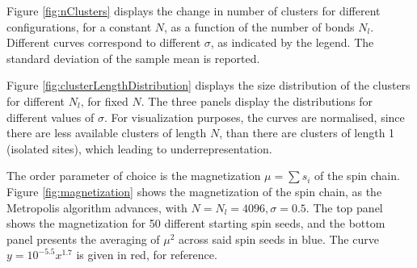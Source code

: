 \documentclass[a4paper]{article}
\providecommand{\DIFaddtex}[1]{{\protect\color{blue}\uwave{#1}}} %
\providecommand{\DIFdeltex}[1]{{\protect\color{red}\sout{#1}}}                      %
\providecommand{\DIFaddbegin}{} %
\providecommand{\DIFaddend}{} %
\providecommand{\DIFdelbegin}{} %
\providecommand{\DIFdelend}{} %
\providecommand{\DIFadd}[1]{\texorpdfstring{\DIFaddtex{#1}}{#1}} %
\providecommand{\DIFdel}[1]{\texorpdfstring{\DIFdeltex{#1}}{}} %
\newcommand{\DIFscaledelfig}{0.5}
\newlength{\DIFdelgraphicswidth} %
\newlength{\DIFdelgraphicsheight} %
\newcommand{\DIFaddincludegraphics}[2][]{{\color{blue}\fbox{\DIFOincludegraphics[#1]{#2}}}} %
\newcommand{\DIFdelincludegraphics}[2][]{%
\sbox{\DIFdelgraphicsbox}{\DIFOincludegraphics[#1]{#2}}%
\settoboxwidth{\DIFdelgraphicswidth}{\DIFdelgraphicsbox} %
\settoboxtotalheight{\DIFdelgraphicsheight}{\DIFdelgraphicsbox} %
\scalebox{\DIFscaledelfig}{%
\parbox[b]{\DIFdelgraphicswidth}{\usebox{\DIFdelgraphicsbox}\\[-\baselineskip] \rule{\DIFdelgraphicswidth}{0em}}\llap{\resizebox{\DIFdelgraphicswidth}{\DIFdelgraphicsheight}{%
\setlength{\unitlength}{\DIFdelgraphicswidth}%
\begin{picture}(1,1)%
\thicklines\linethickness{2pt} %
{\color[rgb]{1,0,0}\put(0,0){\framebox(1,1){}}}%
{\color[rgb]{1,0,0}\put(0,0){\line( 1,1){1}}}%
{\color[rgb]{1,0,0}\put(0,1){\line(1,-1){1}}}%
\end{picture}%
}\hspace*{3pt}}} %
} %
\DeclareRobustCommand{\DIFaddbegin}{\DIFOaddbegin \let\includegraphics\DIFaddincludegraphics} %
\DeclareRobustCommand{\DIFaddend}{\DIFOaddend \let\includegraphics\DIFOincludegraphics} %
\DeclareRobustCommand{\DIFdelbegin}{\DIFOdelbegin \let\includegraphics\DIFdelincludegraphics} %
\DeclareRobustCommand{\DIFdelend}{\DIFOaddend \let\includegraphics\DIFOincludegraphics} %
\begin{document}
%
%
%


Figure \ref{fig:nClusters} displays the change in number of clusters for different configurations, for a constant $N$, as a function of the number of bonds $N_l.$ Different curves correspond to different  $\sigma$, as indicated by the legend. The standard deviation of the sample mean is reported.

Figure \ref{fig:clusterLengthDistribution} displays the size distribution of the clusters for different $N_l$, for fixed $N.$ The three panels display the distributions for different values of  $\sigma.$ For visualization purposes, the curves are normalised, since there are less available clusters of length  $N$,  than there are clusters of length 1 (isolated sites), which leading to underrepresentation.

The order parameter of choice is the magnetization \DIFdelbegin \DIFdel{$\mu = \sum s_i$ }\DIFdelend \DIFaddbegin \DIFadd{$m = \frac{1}{N}\sum_i s_i $ }\DIFaddend of the spin chain. Figure \ref{fig:magnetization} shows the magnetization of the spin chain, as the Metropolis algorithm advances, with $N = N_l = 4096, \sigma = 0.5$. The top panel shows the magnetization for 50 different starting spin seeds, and the bottom panel presents the averaging of \DIFdelbegin \DIFdel{$\mu^2$ }\DIFdelend \DIFaddbegin \DIFadd{$^2$ }\DIFaddend across said spin seeds in blue. The curve  $y = 10^{-5.5} x^{1.7} $ is given in red, for reference.
\end{document}
